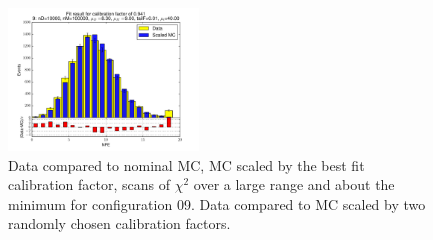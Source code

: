 \begin{figure}[htbp]
\begin{center}
\includegraphics[width=0.45\textwidth]{../FIGURES/09/FIG_Fit_result_for_calibration_factor_of_0_941.pdf} 
\caption{Data compared to nominal MC, MC scaled by the best fit calibration factor, scans of $\chi^2$ over a large range and about the minimum for configuration 09. Data compared to MC scaled by two randomly chosen calibration factors.} 
\label{tab:best_09} 
\end{center} \end{figure} 


